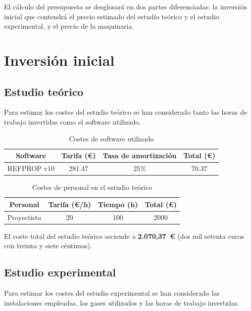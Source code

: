 \documentclass[../main.tex]{subfiles}
\begin{document}
\label{chap:presupuesto}

El cálculo del presupuesto se desglosará en dos partes diferenciadas: la inversión inicial que contendrá el precio estimado del estudio teórico y el estudio experimental, y el precio de la maquinaria.

\section{Inversión inicial}

\subsection{Estudio teórico}

Para estimar los costes del estudio teórico se han considerado tanto las horas de trabajo invertidas como el software utilizado.

\begin{table}[ht]
\centering
\begin{tabular}{|c|c|c|c|}
\hline
\textbf{Software} & \textbf{Tarifa (€)} & \textbf{Tasa de amortización} & \textbf{Total (€)} \\ \hline
REFPROP v10 & 281.47 & 25\% & 70.37 \\ \hline
\end{tabular}
\caption{Costes de software utilizado}
\label{tab:software}
\end{table}

\begin{table}[ht]
\centering
\begin{tabular}{|c|c|c|c|}
\hline
\textbf{Personal} & \textbf{Tarifa (€/h)} & \textbf{Tiempo (h)} & \textbf{Total (€)} \\ \hline
Proyectista & 20 & 100 & 2000 \\ \hline
\end{tabular}
\caption{Costes de personal en el estudio teórico}
\label{tab:personal_teorico}
\end{table}

\FloatBarrier

El coste total del estudio teórico asciende a \textbf{2.070,37~€} (dos mil setenta euros con treinta y siete céntimos).

\subsection{Estudio experimental}

Para estimar los costes del estudio experimental se han considerado las instalaciones empleadas, los gases utilizados y las horas de trabajo invertidas.
\end{document}
